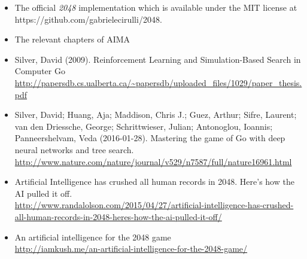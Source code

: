 \documentclass[11pt]{article}
\begin{document}
\begin{itemize}
	\item The official \textit{2048} implementation which is available under the MIT license at\\ 
    https://github.com/gabrielecirulli/2048.
	\item The relevant chapters of AIMA
	\item Silver, David (2009). Reinforcement Learning and Simulation-Based Search in Computer Go \url{http://papersdb.cs.ualberta.ca/~papersdb/uploaded_files/1029/paper_thesis.pdf}
	\item Silver, David; Huang, Aja; Maddison, Chris J.; Guez, Arthur; Sifre, Laurent; van den Driessche, George; Schrittwieser, Julian; Antonoglou, Ioannis; Panneershelvam, Veda (2016-01-28). Mastering the game of Go with deep neural networks and tree search. \url{http://www.nature.com/nature/journal/v529/n7587/full/nature16961.html}
	\item Artificial Intelligence has crushed all human records in 2048.  Here's how the AI pulled it off.\\
    \url{http://www.randalolson.com/2015/04/27/artificial-intelligence-has-crushed-all-human-records-in-2048-heres-how-the-ai-pulled-it-off/}
	\item An artificial intelligence for the 2048 game \\
    \url{http://iamkush.me/an-artificial-intelligence-for-the-2048-game/}
   
\end{itemize}
\end{document}
